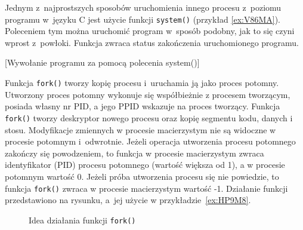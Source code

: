Jednym z~najprostszych sposobów uruchomienia innego procesu z~poziomu programu
w~języku C jest użycie funkcji \texttt{system()} (przykład \ref{ex:V86MA}).
Poleceniem tym można uruchomić program w~sposób podobny, jak to się czyni
wprost z~powłoki. Funkcja zwraca status zakończenia uruchomionego programu.

\begin{example}{[Wywołanie programu za pomocą polecenia system()]}
  \label{ex:V86MA}
  
\end{example}

Funkcja \texttt{fork()} tworzy kopię procesu i~uruchamia ją jako proces
potomny. Utworzony proces potomny wykonuje się współbieżnie z procesem
tworzącym, posiada własny nr PID, a jego PPID wskazuje na proces tworzący.
Funkcja \texttt{fork()} tworzy deskryptor nowego procesu oraz kopię segmentu
kodu, danych i stosu. Modyfikacje zmiennych w procesie macierzystym nie są
widoczne w procesie potomnym i odwrotnie. Jeżeli operacja utworzenia procesu
potomnego zakończy się powodzeniem, to funkcja w procesie macierzystym zwraca
identyfikator (PID) procesu potomnego (wartość większa od 1), a w procesie
potomnym wartość 0. Jeżeli próba utworzenia procesu się nie powiedzie, to
funkcja \texttt{fork()} zwraca w procesie macierzystym wartość -1. Działanie
funkcji przedstawiono na rysunku, a jej użycie w przykładzie~\ref{ex:HP9M8}.

\begin{figure}
  \centering
  \caption{Idea działania funkcji \texttt{fork()}}
  \label{fig:S278F}
\end{figure}

